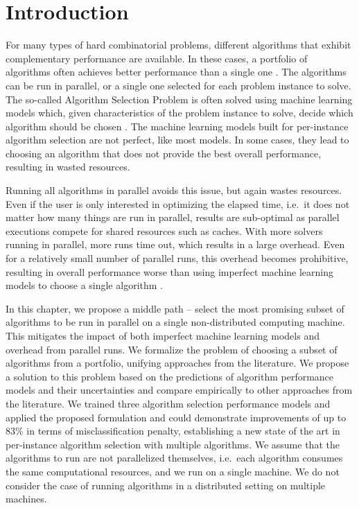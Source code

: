 \section{Introduction}
For many types of hard combinatorial problems, different algorithms that exhibit complementary performance are available. In these cases, a portfolio of algorithms often achieves better performance than a single one \cite{Huberman1997,GOMES200143}. The algorithms can be run in parallel, or a single one selected for each problem instance to solve. The so-called Algorithm Selection Problem \cite{Rice1976} is often solved using machine learning models which, given characteristics of the problem instance to solve, decide which algorithm should be chosen \cite{Kotthoff2014,10.1162/evco_a_00242}. The machine learning models built for per-instance algorithm selection are not perfect, like most models. In some cases, they lead to choosing an algorithm that does not provide the best overall performance, resulting in wasted resources.

Running all algorithms in parallel avoids this issue, but again wastes resources. Even if the user is only interested in optimizing the elapsed time, i.e.\ it does not matter how many things are run in parallel, results are sub-optimal as parallel executions compete for shared resources such as caches. With more solvers running in parallel, more runs time out, which results in a large overhead. Even for a relatively small number of parallel runs, this overhead becomes prohibitive, resulting in overall performance worse than using imperfect machine learning models to choose a single algorithm \cite{pmlr-v140-kashgarani21a}.

In this chapter, we propose a middle path -- select the most promising subset of algorithms to be run in parallel on a single non-distributed computing machine. This mitigates the impact of both imperfect machine learning models and overhead from parallel runs. We formalize the problem of choosing a subset of algorithms from a portfolio, unifying approaches from the literature. We propose a solution to this problem based on the predictions of algorithm performance models and their uncertainties and compare empirically to other approaches from the literature. We trained three algorithm selection performance models and applied the proposed formulation and could demonstrate improvements of up to 83\% in terms of misclassification penalty, establishing a new state of the art in per-instance algorithm selection with multiple algorithms. We assume that the algorithms to run are not parallelized themselves, i.e.\ each algorithm consumes the same computational resources, and we run on a single machine. We do not consider the case of running algorithms in a distributed setting on multiple machines.

